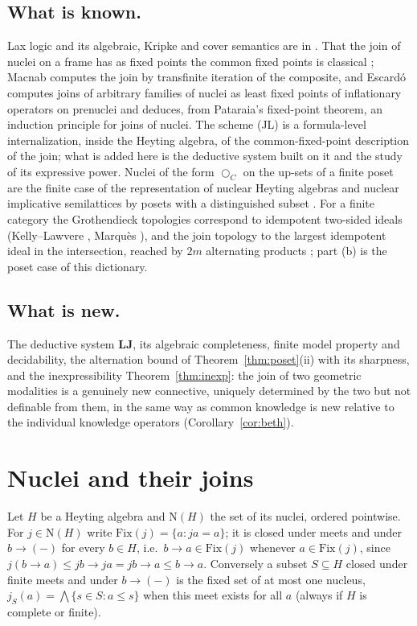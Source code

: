 \documentclass[11pt]{amsart}
\theoremstyle{definition}
\newcommand{\Fix}{\mathrm{Fix}}
\newcommand{\Nuc}{\mathrm{N}}
\newcommand{\LLJ}{\mathbf{LJ}}
\newcommand{\lax}{\bigcirc}
\begin{document}
\subsection*{What is known.}
Lax logic and its algebraic, Kripke and cover semantics are in \cite{FM,
Goldblatt,GoldblattCover}. That the join of nuclei on a frame has as fixed
points the common fixed points is classical \cite[II.2]{Johnstone}; Macnab
\cite{Macnab} computes the join by transfinite iteration of the composite, and
Escard\'o \cite{Escardo} computes joins of arbitrary families of nuclei as
least fixed points of inflationary operators on prenuclei and deduces, from
Pataraia's fixed-point theorem, an induction principle for joins of nuclei.
The scheme (JL) is a formula-level internalization, inside the Heyting
algebra, of the common-fixed-point description of the join; what is added here
is the deductive system built on it and the study of its expressive power. Nuclei of the form
$\lax_C$ on the up-sets of a finite poset are the finite case of the
representation of nuclear Heyting algebras and nuclear implicative semilattices
by posets with a distinguished subset \cite{BH,BBCGGJ}. For a finite category the Grothendieck
topologies correspond to idempotent two-sided ideals (Kelly--Lawvere
\cite{KL89}, Marqu\`es \cite{Marques25}), and the join topology to the largest
idempotent ideal in the intersection, reached by $2m$ alternating products
\cite{Finitejoin}; part (b) is the poset case of this dictionary.

\subsection*{What is new.}
The deductive system $\LLJ$, its algebraic completeness, finite model property
and decidability, the alternation bound
of Theorem~\ref{thm:poset}(ii) with its sharpness, and the inexpressibility
Theorem~\ref{thm:inexp}: the join of two geometric modalities is a genuinely
new connective, uniquely determined by the two but not definable from them,
in the same way as common knowledge is new relative to the individual knowledge
operators (Corollary~\ref{cor:beth}).

\section{Nuclei and their joins}\label{sec:nuclei}

Let $H$ be a Heyting algebra and $\Nuc(H)$ the set of its nuclei, ordered
pointwise. For $j\in\Nuc(H)$ write $\Fix(j)=\{a:ja=a\}$; it is closed under
meets and under $b\to(-)$ for every $b\in H$, i.e.\ $b\to a\in\Fix(j)$ whenever
$a\in\Fix(j)$, since $j(b\to a)\le jb\to ja=jb\to a\le b\to a$. Conversely a
subset $S\subseteq H$ closed under finite meets and under $b\to(-)$ is the
fixed set of at most one nucleus, $j_S(a)=\bigwedge\{s\in S:a\le s\}$ when this
meet exists for all $a$ (always if $H$ is complete or finite).
\end{document}
